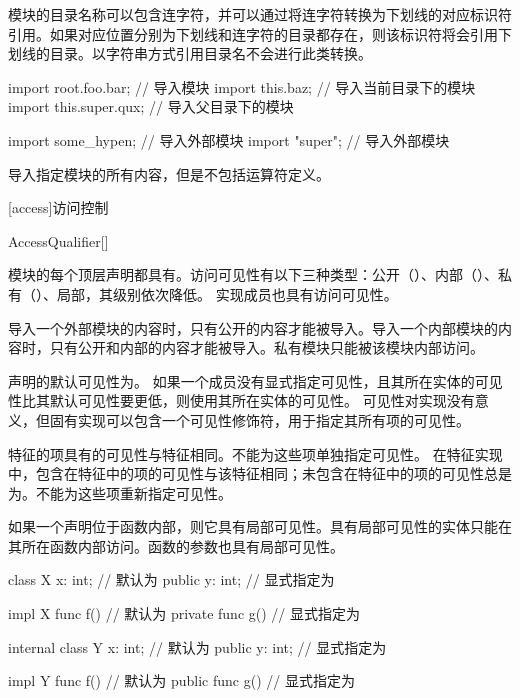 \pnum
模块的目录名称可以包含连字符，并可以通过将连字符转换为下划线的对应标识符引用。如果对应位置分别为下划线和连字符的目录都存在，则该标识符将会引用下划线的目录。以字符串方式引用目录名不会进行此类转换。

\enterexample
\begin{codeblock}
import root.foo.bar; // 导入模块
import this.baz; // 导入当前目录下的模块
import this.super.qux; // 导入父目录下的模块

import some_hypen; // 导入外部模块
import "super"; // 导入外部模块
\end{codeblock}
\exitexample

\pnum
\tcode{*}导入指定模块的所有内容，但是不包括运算符定义。

[access]{访问控制}

\begin{bnf}{AccessQualifier}[\oneof]
\end{bnf}

\pnum
模块的每个顶层声明都具有。访问可见性有以下三种类型：公开（）、内部（）、私有（）、局部，其级别依次降低。
实现成员也具有访问可见性。

\pnum
导入一个外部模块的内容时，只有公开的内容才能被导入。导入一个内部模块的内容时，只有公开和内部的内容才能被导入。私有模块只能被该模块内部访问。

\pnum
声明的默认可见性为。
如果一个成员没有显式指定可见性，且其所在实体的可见性比其默认可见性要更低，则使用其所在实体的可见性。
可见性对实现没有意义，但固有实现可以包含一个可见性修饰符，用于指定其所有项的可见性。

\pnum
特征的项具有的可见性与特征相同。不能为这些项单独指定可见性。
在特征实现中，包含在特征中的项的可见性与该特征相同；未包含在特征中的项的可见性总是为。不能为这些项重新指定可见性。

\pnum
如果一个声明位于函数内部，则它具有局部可见性。具有局部可见性的实体只能在其所在函数内部访问。函数的参数也具有局部可见性。

\enterexample
\begin{codeblock}
class X {
    x: int; // 默认为
    public y: int; // 显式指定为
}

impl X {
    func f() {} // 默认为
    private func g() {} // 显式指定为
}

internal class Y {
    x: int; // 默认为
    public y: int; // 显式指定为
}

impl Y {
    func f() {} // 默认为
    public func g() {} // 显式指定为
}
\end{codeblock}